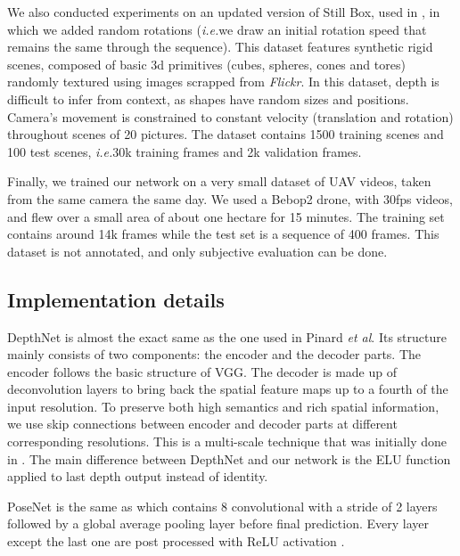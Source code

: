 \documentclass[runningheads]{llncs}
\def\etal{\emph{et al}\:}
\def\ie{\emph{i.e.}\:}
\begin{document}
We also conducted experiments on an updated version of Still Box, used in \cite{isprs-annals-IV-2-W3-67-2017}, in which we added random rotations
(\ie we draw an initial rotation speed that remains the same through the sequence).
This dataset features synthetic rigid scenes, composed of basic 3d primitives (cubes, spheres, cones and tores) randomly textured using images scrapped from \textit{Flickr}. In this dataset, depth is difficult to infer from context, as shapes have random sizes and positions. Camera's movement is constrained to constant velocity (translation and rotation) throughout scenes of 20 pictures.
The dataset contains 1500 training scenes and 100 test scenes, \ie 30k training frames and 2k validation frames.

Finally, we trained our network on a very small dataset of UAV videos, taken from the same camera the same day. We used a Bebop2 drone, with 30fps videos, and flew over a small area of about one hectare for 15 minutes.
The training set contains around 14k frames while the test set is a sequence of 400 frames. This dataset is not annotated, and only subjective evaluation can be done.

\subsection{Implementation details}
DepthNet is almost the exact same as the one used in Pinard \etal \cite{isprs-annals-IV-2-W3-67-2017}. Its structure mainly consists of two components: the encoder and the decoder parts. The encoder follows the basic structure of VGG\cite{Simonyan14c}. The decoder is made up of deconvolution layers to bring back the spatial feature maps up to a fourth of the input resolution.
To preserve both high semantics and rich spatial information, we use skip connections between encoder and decoder parts at different corresponding resolutions. This is a multi-scale technique that was initially done in \cite{DFIB15}.
The main difference between DepthNet and our network is the ELU function \cite{clevert2015fast} applied to last depth output instead of identity.

PoseNet is the same as
\cite{zhou2017unsupervised} which contains 8 convolutional with a stride of 2 layers followed by a global average pooling layer before final prediction. Every layer except the last one are post processed with ReLU activation \cite{nair2010rectified}.
\end{document}

